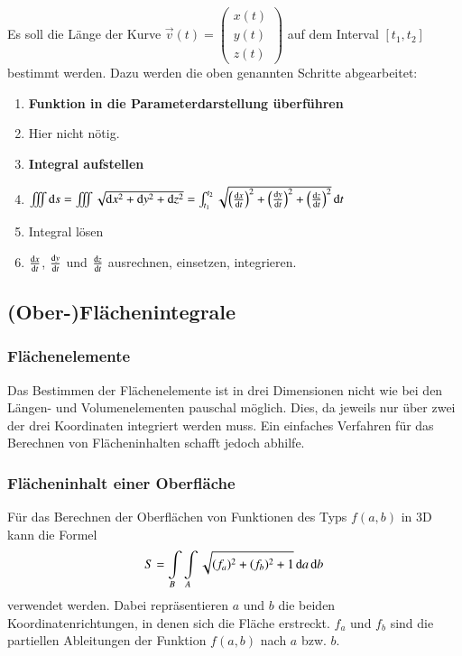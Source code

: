 Es soll die Länge der Kurve $\vec{v}(t) = \begin{pmatrix}x(t)\\y(t)\\z(t)\end{pmatrix}$ auf dem Interval $[t_1, t_2]$ bestimmt werden.
Dazu werden die oben genannten Schritte abgearbeitet:
\begin{enumerate}
    \item \textbf{Funktion in die Parameterdarstellung überführen}
    \item[] Hier nicht nötig. %
    \item \textbf{Integral aufstellen} 
    \item[] $ \iiint \diff s = \iiint \sqrt{\diff x^2 + \diff y^2 + \diff z^2} = \int_{t_1}^{t_2} \sqrt{\left(\frac{\diff x}{\diff t}\right)^2 + \left(\frac{\diff y}{\diff t}\right)^2 + \left(\frac{\diff z}{\diff t}\right)^2} \diff t$
    \item Integral lösen
    \item[] $\frac{\mathop{} \! \mathrm{d} x}{\mathop{} \! \mathrm{d} t}$, $\frac{\mathop{} \! \mathrm{d} y}{\mathop{} \! \mathrm{d} t}$ und $\frac{\mathop{} \! \mathrm{d} z}{\mathop{} \! \mathrm{d} t}$ ausrechnen, einsetzen, integrieren.
\end{enumerate}


\subsection{(Ober-)Flächenintegrale}
\subsubsection{Flächenelemente}
Das Bestimmen der Flächenelemente ist in drei Dimensionen nicht wie bei den Längen- und Volumenelementen pauschal möglich.
Dies, da jeweils nur über zwei der drei Koordinaten integriert werden muss.
Ein einfaches Verfahren für das Berechnen von Flächeninhalten schafft jedoch abhilfe.
\subsubsection{Flächeninhalt einer Oberfläche}
Für das Berechnen der Oberflächen von Funktionen des Typs $f(a, b)$ in 3D kann die Formel
$$ S = \int\limits_{B} \int\limits_{A} \sqrt{(f_{a})^2 + (f_{b})^2 + 1} \mathop{} \! \mathrm{d} a \mathop{} \! \mathrm{d} b $$
verwendet werden. Dabei repräsentieren $a$ und $b$ die beiden Koordinatenrichtungen, in denen sich die Fläche erstreckt.
$f_a$ und $f_b$ sind die partiellen Ableitungen der Funktion $f(a, b)$ nach $a$ bzw. $b$.
\medskip


